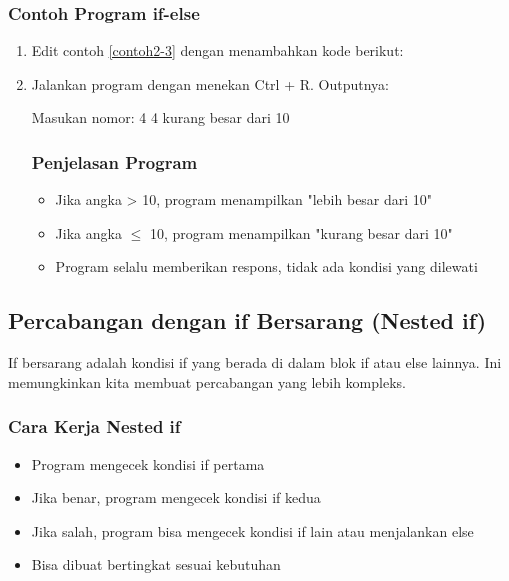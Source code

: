 \subsubsection*{Contoh Program if-else}

\begin{enumerate}
\item Edit contoh \ref{contoh2-3} dengan menambahkan kode berikut:



\item Jalankan program dengan menekan Ctrl + R. Outputnya:

\begin{lcverbatim}
Masukan nomor: 4
4 kurang besar dari 10
\end{lcverbatim}

\subsubsection*{Penjelasan Program}
\begin{itemize}
\item Jika angka > 10, program menampilkan "lebih besar dari 10"
\item Jika angka $\leq$ 10, program menampilkan "kurang besar dari 10"
\item Program selalu memberikan respons, tidak ada kondisi yang dilewati
\end{itemize}
\end{enumerate}

\subsection{Percabangan dengan if Bersarang (Nested if)}

If bersarang adalah kondisi if yang berada di dalam blok if atau else lainnya. Ini memungkinkan kita membuat percabangan yang lebih kompleks.

\subsubsection{Cara Kerja Nested if}

\begin{itemize}
\item Program mengecek kondisi if pertama
\item Jika benar, program mengecek kondisi if kedua
\item Jika salah, program bisa mengecek kondisi if lain atau menjalankan else
\item Bisa dibuat bertingkat sesuai kebutuhan
\end{itemize}

